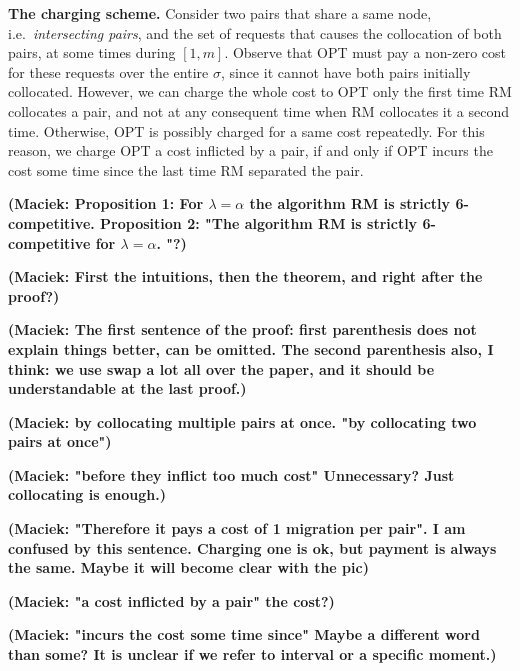 \documentclass[a4paper,anonymous,USenglish]{lipics-v2019}
\newcommand{\OPT}{\textsf{OPT}\xspace}
\newcommand{\RM}{\textsf{RM}\xspace} %
\newcommand\maciek[1]{\color{brown}\textbf{(Maciek: #1)}\color{black}}
\begin{document}
\textbf{The charging scheme.}
Consider two  pairs that share a same node, 
i.e.~\emph{intersecting pairs},
and the set of requests that causes the collocation of both pairs,
at some  times during  $[1,m]$.
Observe that \OPT must pay a non-zero cost
for these requests over the entire $\sigma$,
since it cannot have both pairs initially collocated.
However,
we can charge the whole cost to \OPT only the first time \RM collocates a pair,
and not at any consequent time when \RM collocates it a second time.
Otherwise,
 \OPT is possibly charged for a same cost repeatedly.
For this reason,
we charge \OPT a cost inflicted by a pair,
if and only if  \OPT incurs the cost some time since the last time \RM separated the pair.

	\maciek{Proposition 1: For $\lambda=\alpha$ the algorithm \RM is strictly 6-competitive.	Proposition 2: "The algorithm \RM is strictly 6-competitive for $\lambda=\alpha$.	"?}

\maciek{First the intuitions, then the theorem, and right after the proof?}


\maciek{The first sentence of the proof: first parenthesis does not explain things better, can be omitted. The second parenthesis also, I think: we use swap a lot all over the paper, and it should be understandable at the last proof.}

\maciek{by collocating multiple pairs at once. "by collocating \textbf{two} pairs at once"}

\maciek{"before they inflict too much cost" Unnecessary? Just collocating is enough.}

\maciek{"Therefore it pays a cost of 1 migration per pair". I am confused by this sentence. Charging one is ok, but payment is always the same. Maybe it will become clear with the pic}

\maciek{"a cost inflicted by a pair" the cost?}

\maciek{"incurs the cost some time since" Maybe a different word than some? It is unclear if we refer to interval or a specific moment.}
\end{document}
